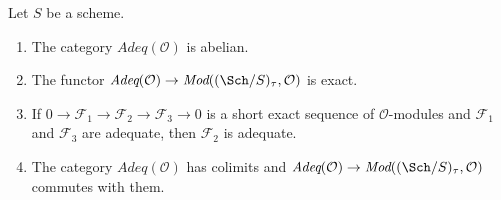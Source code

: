 \begin{lemma}
\label{lemma-abelian-adequate}
Let $S$ be a scheme.
\begin{enumerate}
\item The category $\textit{Adeq}(\mathcal{O})$ is abelian.
\item The functor
$\textit{Adeq}(\mathcal{O}) \to
\textit{Mod}((\Sch/S)_\tau, \mathcal{O})$
is exact.
\item If $0 \to \mathcal{F}_1 \to \mathcal{F}_2 \to \mathcal{F}_3 \to 0$
is a short exact sequence of $\mathcal{O}$-modules and
$\mathcal{F}_1$ and $\mathcal{F}_3$ are adequate, then
$\mathcal{F}_2$ is adequate.
\item The category $\textit{Adeq}(\mathcal{O})$ has colimits and
$\textit{Adeq}(\mathcal{O}) \to
\textit{Mod}((\Sch/S)_\tau, \mathcal{O})$
commutes with them.
\end{enumerate}
\end{lemma}

